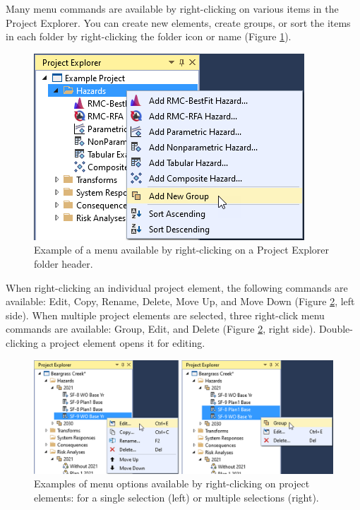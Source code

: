 \documentclass[
]{book}
\begin{document}
Many menu commands are available by right-clicking on various items in the Project Explorer. You can create new elements, create groups, or sort the items in each folder by right-clicking the folder icon or name (Figure \ref{fig:figure-25}).

\begin{figure}

{\centering \includegraphics{images/figure25} 

}

\caption{Example of a menu available by right-clicking on a Project Explorer folder header.}\label{fig:figure-25}
\end{figure}

When right-clicking an individual project element, the following commands are available: Edit, Copy, Rename, Delete, Move Up, and Move Down (Figure \ref{fig:figure-26}, left side). When multiple project elements are selected, three right-click menu commands are available: Group, Edit, and Delete (Figure \ref{fig:figure-26}, right side). Double-clicking a project element opens it for editing.

\begin{figure}

{\centering \includegraphics{images/figure26} 

}

\caption{Examples of menu options available by right-clicking on project elements: for a single selection (left) or multiple selections (right).}\label{fig:figure-26}
\end{figure}
\end{document}

